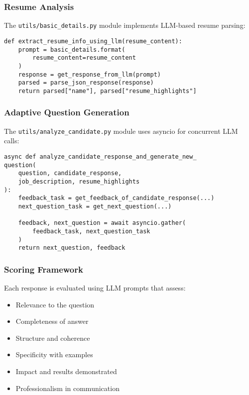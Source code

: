 \documentclass[conference]{IEEEtran}
\begin{document}
\subsubsection{Resume Analysis}
The \texttt{utils/basic\_details.py} module implements LLM-based resume parsing:

\begin{lstlisting}[caption={Resume Analysis Function}, label={lst:resume-analysis}]
def extract_resume_info_using_llm(resume_content):
    prompt = basic_details.format(
        resume_content=resume_content
    )
    response = get_response_from_llm(prompt)
    parsed = parse_json_response(response)
    return parsed["name"], parsed["resume_highlights"]
\end{lstlisting}


\subsubsection{Adaptive Question Generation}
The \texttt{utils/analyze\_candidate.py} module uses asyncio for concurrent LLM calls:

\begin{lstlisting}[caption={Adaptive Question Generation Code}, label={lst:adaptive-code}]
async def analyze_candidate_response_and_generate_new_
question(
    question, candidate_response, 
    job_description, resume_highlights
):
    feedback_task = get_feedback_of_candidate_response(...)
    next_question_task = get_next_question(...)
    
    feedback, next_question = await asyncio.gather(
        feedback_task, next_question_task
    )
    return next_question, feedback
\end{lstlisting}

\subsubsection{Scoring Framework}
Each response is evaluated using LLM prompts that assess:
\begin{itemize}
\item Relevance to the question
\item Completeness of answer
\item Structure and coherence
\item Specificity with examples
\item Impact and results demonstrated
\item Professionalism in communication
\end{itemize}
\end{document}
